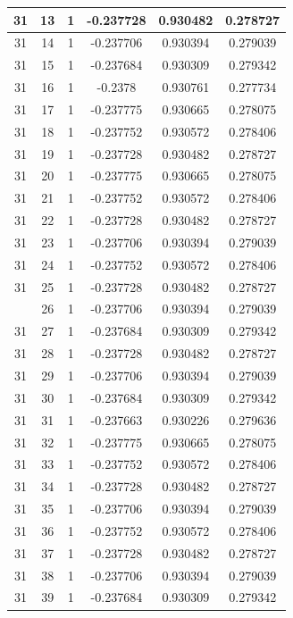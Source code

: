 \documentclass[12pt,a4paper]{article}
\numberwithin{equation}{section}
\numberwithin{figure}{section}
\numberwithin{table}{section}
\begin{document}
\begin{longtable}{|c|c|c|c|c|c|}
31 & 13 & 1 & -0.237728 & 0.930482 & 0.278727 \\ \hline
31 & 14 & 1 & -0.237706 & 0.930394 & 0.279039 \\ \hline
31 & 15 & 1 & -0.237684 & 0.930309 & 0.279342 \\ \hline
31 & 16 & 1 & -0.2378 & 0.930761 & 0.277734 \\ \hline
31 & 17 & 1 & -0.237775 & 0.930665 & 0.278075 \\ \hline
31 & 18 & 1 & -0.237752 & 0.930572 & 0.278406 \\ \hline
31 & 19 & 1 & -0.237728 & 0.930482 & 0.278727 \\ \hline
31 & 20 & 1 & -0.237775 & 0.930665 & 0.278075 \\ \hline
31 & 21 & 1 & -0.237752 & 0.930572 & 0.278406 \\ \hline
31 & 22 & 1 & -0.237728 & 0.930482 & 0.278727 \\ \hline
31 & 23 & 1 & -0.237706 & 0.930394 & 0.279039 \\ \hline
31 & 24 & 1 & -0.237752 & 0.930572 & 0.278406 \\ \hline
31 & 25 & 1 & -0.237728 & 0.930482 & 0.278727 \\ \hline
\pagebreak
31 & 26 & 1 & -0.237706 & 0.930394 & 0.279039 \\ \hline
31 & 27 & 1 & -0.237684 & 0.930309 & 0.279342 \\ \hline
31 & 28 & 1 & -0.237728 & 0.930482 & 0.278727 \\ \hline
31 & 29 & 1 & -0.237706 & 0.930394 & 0.279039 \\ \hline
31 & 30 & 1 & -0.237684 & 0.930309 & 0.279342 \\ \hline
31 & 31 & 1 & -0.237663 & 0.930226 & 0.279636 \\ \hline
31 & 32 & 1 & -0.237775 & 0.930665 & 0.278075 \\ \hline
31 & 33 & 1 & -0.237752 & 0.930572 & 0.278406 \\ \hline
31 & 34 & 1 & -0.237728 & 0.930482 & 0.278727 \\ \hline
31 & 35 & 1 & -0.237706 & 0.930394 & 0.279039 \\ \hline
31 & 36 & 1 & -0.237752 & 0.930572 & 0.278406 \\ \hline
31 & 37 & 1 & -0.237728 & 0.930482 & 0.278727 \\ \hline
31 & 38 & 1 & -0.237706 & 0.930394 & 0.279039 \\ \hline
31 & 39 & 1 & -0.237684 & 0.930309 & 0.279342 \\ \hline

\end{longtable}
\end{document}

